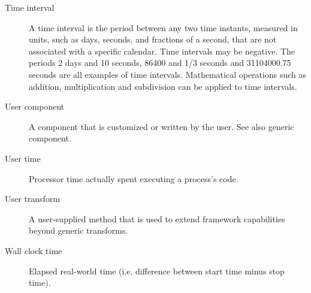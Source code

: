 \begin{description}
\item [Time interval] \label{glos:TimeInterval} A time interval is the
period between any two time instants, measured in units, such as days, 
seconds, and fractions of a second, that are not associated with a specific
calendar.  Time intervals may be negative.  The periods 2 days and 10 seconds, 
86400 and 1/3 seconds and 31104000.75 seconds are all examples of time intervals.  
Mathematical operations such as addition, multiplication and subdivision 
can be applied to time intervals.

\item [User component] \label{UserComp} A component that is customized or
written by the user.  See also generic component.

\item [User time] \label{UserTime} Processor time actually spent executing a process's code.

\item[User transform] \label{glos:UserTrans} A user-supplied 
  method that is used to extend framework capabilities beyond generic 
  transforms.  

\item [Wall clock time] \label{WallClockTime} Elapsed real-world time (i.e. difference between start time minus
stop time).

\end{description}








































